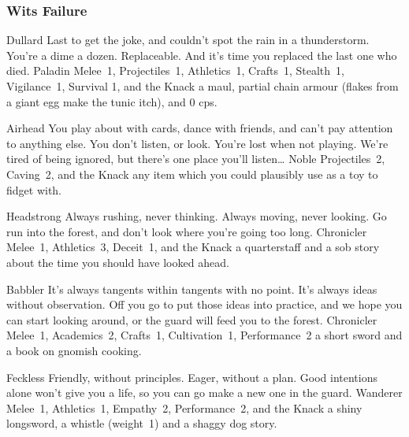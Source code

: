\begin{multicols}{2}
\begin{itemize}
\end{itemize}

\needspace{10em}
\subsubsection{Wits Failure}
\begin{itemize}

  {Dullard}%
  {%
    Last to get the joke, and couldn't spot the rain in a thunderstorm.
    You're a dime a dozen.
    Replaceable.
    And it's time you replaced the last one who died.
  }%
  {Paladin}%
  {Melee~1, Projectiles~1, Athletics~1, Crafts~1, Stealth~1, Vigilance~1, Survival 1, and the Knack \lucky}%
  {a maul, partial chain armour (flakes from a giant egg make the tunic itch), and 0 \glspl{cp}.}%

  {Airhead}%
  {You play about with cards, dance with friends, and can't pay attention to anything else.
  You don't listen, or look.
  You're lost when not playing.
  We're tired of being ignored, but there's one place you'll listen\ldots
  }%
  {Noble}%
  {Projectiles~2, Caving~2, and the Knack \unstoppable}%
  {any item which you could plausibly use as a toy to fidget with.}%

  {Headstrong}%
  {Always rushing, never thinking.
  Always moving, never looking.
  Go run into the forest, and don't look where you're going too long.
  }%
  {Chronicler}%
  {Melee~1, Athletics~3, Deceit~1, and the Knack \charge}%
  {a quarterstaff and a sob story about the time you should have looked ahead.}%

  {Babbler}%
  {It's always tangents within tangents with no point.
  It's always ideas without observation.
  Off you go to put those ideas into practice, and we hope you can start looking around, or the \gls{guard} will feed you to the forest.
  }%
  {Chronicler}%
  {Melee~1, Academics~2, Crafts~1, Cultivation~1, Performance~2}%
  {a short sword and a book on gnomish cooking.}%

  {Feckless}%
  {Friendly, without principles.
  Eager, without a plan.
  Good intentions alone won't give you a life, so you can go make a new one in the \gls{guard}.
  }%
  {Wanderer}%
  {Melee~1, Athletics~1, Empathy~2, Performance~2, and the Knack \fasthealer}%
  {a shiny longsword, a whistle (\gls{weight}~1) and a shaggy dog story.}%


\end{itemize}
\end{multicols}
